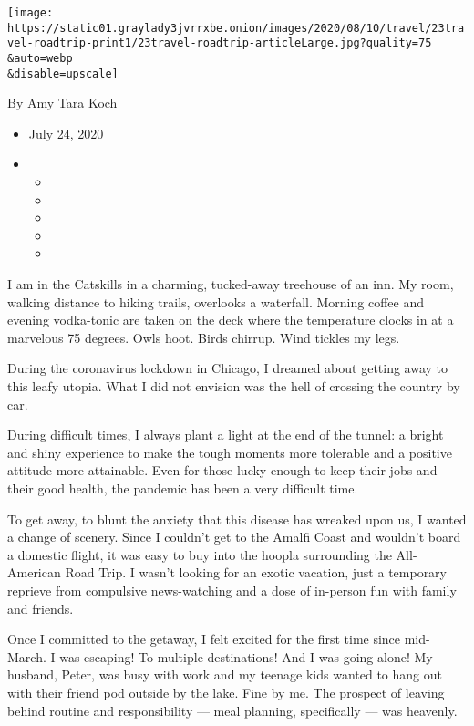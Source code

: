 \texttt{[image: https://static01.graylady3jvrrxbe.onion/images/2020/08/10/travel/23travel-roadtrip-print1/23travel-roadtrip-articleLarge.jpg?quality=75\\\&auto=webp\\\&disable=upscale]}

By Amy Tara Koch

\begin{itemize}
\item
  July 24, 2020
\item
  \begin{itemize}
  \item
  \item
  \item
  \item
  \item
  \end{itemize}
\end{itemize}

I am in the Catskills in a charming, tucked-away treehouse of an inn. My
room, walking distance to hiking trails, overlooks a waterfall. Morning
coffee and evening vodka-tonic are taken on the deck where the
temperature clocks in at a marvelous 75 degrees. Owls hoot. Birds
chirrup. Wind tickles my legs.

During the coronavirus lockdown in Chicago, I dreamed about getting away
to this leafy utopia. What I did not envision was the hell of crossing
the country by car.

During difficult times, I always plant a light at the end of the tunnel:
a bright and shiny experience to make the tough moments more tolerable
and a positive attitude more attainable. Even for those lucky enough to
keep their jobs and their good health, the pandemic has been a very
difficult time.

To get away, to blunt the anxiety that this disease has wreaked upon us,
I wanted a change of scenery. Since I couldn't get to the Amalfi Coast
and wouldn't board a domestic flight, it was easy to buy into the hoopla
surrounding the All-American Road Trip. I wasn't looking for an exotic
vacation, just a temporary reprieve from compulsive news-watching and a
dose of in-person fun with family and friends.

Once I committed to the getaway, I felt excited for the first time since
mid-March. I was escaping! To multiple destinations! And I was going
alone! My husband, Peter, was busy with work and my teenage kids wanted
to hang out with their friend pod outside by the lake. Fine by me. The
prospect of leaving behind routine and responsibility --- meal planning,
specifically --- was heavenly.

